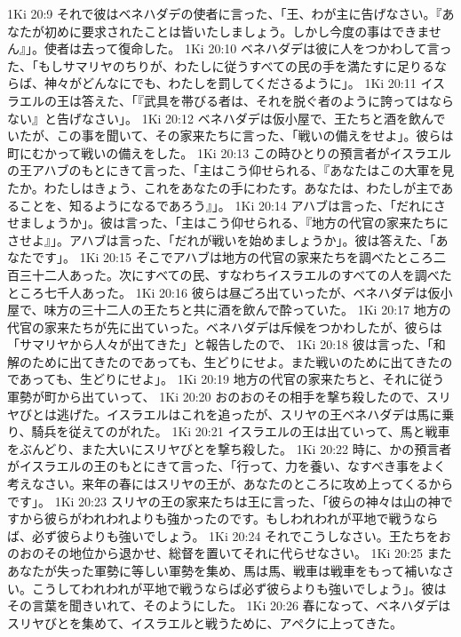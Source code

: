 1Ki 20:9  それで彼はベネハダデの使者に言った、「王、わが主に告げなさい。『あなたが初めに要求されたことは皆いたしましょう。しかし今度の事はできません』」。使者は去って復命した。
1Ki 20:10  ベネハダデは彼に人をつかわして言った、「もしサマリヤのちりが、わたしに従うすべての民の手を満たすに足りるならば、神々がどんなにでも、わたしを罰してくださるように」。
1Ki 20:11  イスラエルの王は答えた、「『武具を帯びる者は、それを脱ぐ者のように誇ってはならない』と告げなさい」。
1Ki 20:12  ベネハダデは仮小屋で、王たちと酒を飲んでいたが、この事を聞いて、その家来たちに言った、「戦いの備えをせよ」。彼らは町にむかって戦いの備えをした。
1Ki 20:13  この時ひとりの預言者がイスラエルの王アハブのもとにきて言った、「主はこう仰せられる、『あなたはこの大軍を見たか。わたしはきょう、これをあなたの手にわたす。あなたは、わたしが主であることを、知るようになるであろう』」。
1Ki 20:14  アハブは言った、「だれにさせましょうか」。彼は言った、「主はこう仰せられる、『地方の代官の家来たちにさせよ』」。アハブは言った、「だれが戦いを始めましょうか」。彼は答えた、「あなたです」。
1Ki 20:15  そこでアハブは地方の代官の家来たちを調べたところ二百三十二人あった。次にすべての民、すなわちイスラエルのすべての人を調べたところ七千人あった。
1Ki 20:16  彼らは昼ごろ出ていったが、ベネハダデは仮小屋で、味方の三十二人の王たちと共に酒を飲んで酔っていた。
1Ki 20:17  地方の代官の家来たちが先に出ていった。ベネハダデは斥候をつかわしたが、彼らは「サマリヤから人々が出てきた」と報告したので、
1Ki 20:18  彼は言った、「和解のために出てきたのであっても、生どりにせよ。また戦いのために出てきたのであっても、生どりにせよ」。
1Ki 20:19  地方の代官の家来たちと、それに従う軍勢が町から出ていって、
1Ki 20:20  おのおのその相手を撃ち殺したので、スリヤびとは逃げた。イスラエルはこれを追ったが、スリヤの王ベネハダデは馬に乗り、騎兵を従えてのがれた。
1Ki 20:21  イスラエルの王は出ていって、馬と戦車をぶんどり、また大いにスリヤびとを撃ち殺した。
1Ki 20:22  時に、かの預言者がイスラエルの王のもとにきて言った、「行って、力を養い、なすべき事をよく考えなさい。来年の春にはスリヤの王が、あなたのところに攻め上ってくるからです」。
1Ki 20:23  スリヤの王の家来たちは王に言った、「彼らの神々は山の神ですから彼らがわれわれよりも強かったのです。もしわれわれが平地で戦うならば、必ず彼らよりも強いでしょう。
1Ki 20:24  それでこうしなさい。王たちをおのおのその地位から退かせ、総督を置いてそれに代らせなさい。
1Ki 20:25  またあなたが失った軍勢に等しい軍勢を集め、馬は馬、戦車は戦車をもって補いなさい。こうしてわれわれが平地で戦うならば必ず彼らよりも強いでしょう」。彼はその言葉を聞きいれて、そのようにした。
1Ki 20:26  春になって、ベネハダデはスリヤびとを集めて、イスラエルと戦うために、アペクに上ってきた。
